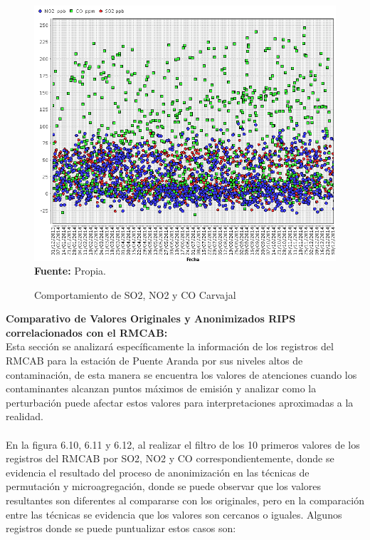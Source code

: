 \documentclass[a4paper,openright,12pt]{book}
\theoremstyle{definition}
\theoremstyle{remark}
\begin{document}
\begin{figure}[h]
\centering
\caption{Comportamiento de SO2, NO2 y CO Carvajal} 
\includegraphics[scale=0.43]{Componentes/Carvajal_Componentes}
\label{fig:Tabla1}
\\ \textbf{Fuente: }Propia.
\end{figure}
\textbf{Comparativo de Valores Originales y Anonimizados RIPS correlacionados con el RMCAB:}\\
Esta sección  se analizará específicamente la información de los registros del RMCAB  para la estación de Puente Aranda por sus niveles altos de contaminación, de esta manera se encuentra los valores de atenciones cuando  los contaminantes alcanzan puntos máximos de emisión y analizar como la perturbación puede afectar estos valores para interpretaciones aproximadas a la realidad.\\\\En la figura 6.10, 6.11 y 6.12,  al realizar el filtro de los 10  primeros valores de los registros del RMCAB por SO2, NO2 y CO correspondientemente, donde se evidencia el resultado del proceso de anonimización en las técnicas de permutación y microagregación, donde  se puede observar  que los valores resultantes son diferentes al compararse con los originales, pero en la comparación entre las técnicas  se evidencia que los valores son cercanos o iguales. Algunos registros donde se puede  puntualizar estos casos son:
\end{document}
